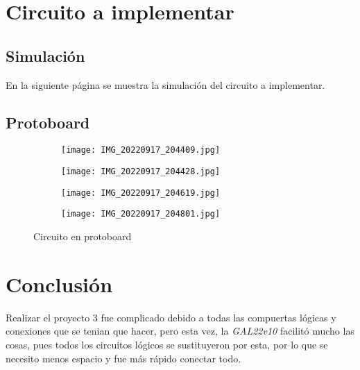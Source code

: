 \documentclass[12pt, oneside, openany]{article}
\begin{document}
\section{Circuito a implementar}

\subsection{Simulación}
{\sffamily\large
    \hspace{0.5cm} En la siguiente página se muestra la simulación del circuito a implementar.
    
    \newpage
    
    
}

\subsection{Protoboard}
\begin{figure}[h!]
    \centering
    \begin{subfigure}[tl]{0.45\textwidth}
        \centering
        \texttt{[image: IMG\_20220917\_204409.jpg]}
    \end{subfigure}
    \begin{subfigure}[tr]{0.45\textwidth}
        \centering
        \texttt{[image: IMG\_20220917\_204428.jpg]}
    \end{subfigure}
    \begin{subfigure}[bl]{0.45\textwidth}
        \centering
        \texttt{[image: IMG\_20220917\_204619.jpg]}
    \end{subfigure}
    \begin{subfigure}[br]{0.45\textwidth}
        \centering
        \texttt{[image: IMG\_20220917\_204801.jpg]}
    \end{subfigure}
    \caption{\sffamily Circuito en protoboard}
    \label{fig:proto}
\end{figure}

\section{Conclusión}
{\sffamily\large
    \hspace{0.5cm} Realizar el proyecto 3 fue complicado debido a todas las compuertas lógicas y conexiones que se tenian que hacer, pero esta vez, la \emph{GAL22v10} facilitó mucho las cosas, pues todos los circuitos lógicos se sustituyeron por esta, por lo que se necesito menos espacio y fue más rápido conectar todo.
}
\end{document}
